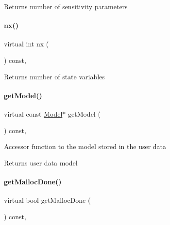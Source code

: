 \begin{DoxyReturn}{Returns}
number of sensitivity parameters 
\end{DoxyReturn}
\mbox{\label{classamici_1_1_solver_a86a18c4e461de76881b6af72e4feb8d9}} 
\paragraph{\texorpdfstring{nx()}{nx()}}
{\footnotesize\ttfamily virtual int nx (\begin{DoxyParamCaption}{ }\end{DoxyParamCaption}) const\hspace{0.3cm}{\ttfamily [protected]}, {}}

\begin{DoxyReturn}{Returns}
number of state variables 
\end{DoxyReturn}
\mbox{\label{classamici_1_1_solver_a3ea583e4e53b188c54f426f1bc652a0f}} 
\paragraph{\texorpdfstring{getModel()}{getModel()}}
{\footnotesize\ttfamily virtual const \mbox{\hyperlink{classamici_1_1_model}{Model}}$\ast$ get\+Model (\begin{DoxyParamCaption}{ }\end{DoxyParamCaption}) const\hspace{0.3cm}{\ttfamily [protected]}, {}}

Accessor function to the model stored in the user data

\begin{DoxyReturn}{Returns}
user data model 
\end{DoxyReturn}
\mbox{\label{classamici_1_1_solver_af4bbf9fea3348d86380be1c059e4b9f5}} 
\paragraph{\texorpdfstring{getMallocDone()}{getMallocDone()}}
{\footnotesize\ttfamily virtual bool get\+Malloc\+Done (\begin{DoxyParamCaption}{ }\end{DoxyParamCaption}) const\hspace{0.3cm}{\ttfamily [protected]}, {}}

